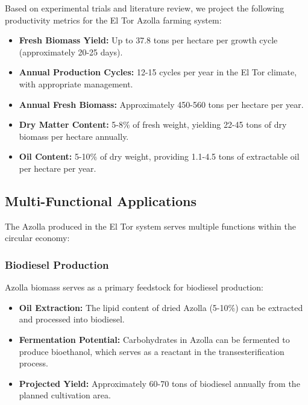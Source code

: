 Based on experimental trials and literature review, we project the following productivity metrics for the El Tor Azolla farming system:

\begin{itemize}
    \item \textbf{Fresh Biomass Yield:} Up to 37.8 tons per hectare per growth cycle (approximately 20-25 days).
    
    \item \textbf{Annual Production Cycles:} 12-15 cycles per year in the El Tor climate, with appropriate management.
    
    \item \textbf{Annual Fresh Biomass:} Approximately 450-560 tons per hectare per year.
    
    \item \textbf{Dry Matter Content:} 5-8\% of fresh weight, yielding 22-45 tons of dry biomass per hectare annually.
    
    \item \textbf{Oil Content:} 5-10\% of dry weight, providing 1.1-4.5 tons of extractable oil per hectare per year.
\end{itemize}

\subsection{Multi-Functional Applications}

The Azolla produced in the El Tor system serves multiple functions within the circular economy:

\subsubsection{Biodiesel Production}

Azolla biomass serves as a primary feedstock for biodiesel production:

\begin{itemize}
    \item \textbf{Oil Extraction:} The lipid content of dried Azolla (5-10\%) can be extracted and processed into biodiesel.
    
    \item \textbf{Fermentation Potential:} Carbohydrates in Azolla can be fermented to produce bioethanol, which serves as a reactant in the transesterification process.
    
    \item \textbf{Projected Yield:} Approximately 60-70 tons of biodiesel annually from the planned cultivation area.
\end{itemize}

